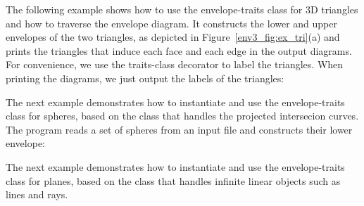 The following example shows how to use the envelope-traits class
for 3D triangles and how to traverse the envelope diagram. It
constructs the lower and upper envelopes of the two triangles,
as depicted in Figure~\ref{env3_fig:ex_tri}(a) and prints the
triangles that induce each face and each edge in the output diagrams.
For convenience, we use the traits-class decorator
 to label the triangles. When
printing the diagrams, we just output the labels of the triangles:


The next example demonstrates how to instantiate and use the
envelope-traits class for spheres, based on the
 class that handles the projected intersecion
curves. The program reads a set of spheres from an input file and
constructs their lower envelope:


The next example demonstrates how to instantiate and use the
envelope-traits class for planes, based on the
 class that handles infinite linear objects such as lines and rays.

